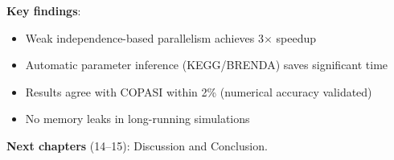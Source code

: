 \textbf{Key findings}:

\begin{itemize}
    \item Weak independence-based parallelism achieves 3$\times$ speedup
    \item Automatic parameter inference (KEGG/BRENDA) saves significant time
    \item Results agree with COPASI within 2\% (numerical accuracy validated)
    \item No memory leaks in long-running simulations
\end{itemize}

\textbf{Next chapters} (14--15): Discussion and Conclusion.

